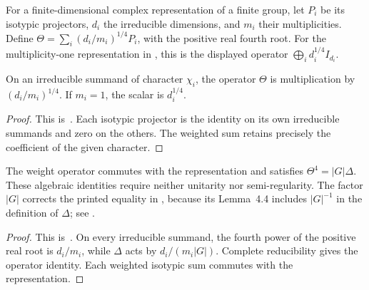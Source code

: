 \begin{definition}%
    \label{def:peps_representation_theta}
    \leanok
    For a finite-dimensional complex representation of a finite group,
    let $P_i$ be its isotypic projectors, $d_i$ the irreducible dimensions,
    and $m_i$ their multiplicities. Define
    $\Theta=\sum_i(d_i/m_i)^{1/4}P_i$, with the positive real fourth root.
    For the multiplicity-one representation in
    \cite[Section~7]{Schuch2010PEPS}, this is the displayed operator
    $\bigoplus_i d_i^{1/4}I_{d_i}$.
\end{definition}

\begin{lemma}%
    \label{thm:peps_representation_theta_scalar}
    \leanok
    On an irreducible summand of character $\chi_i$, the operator $\Theta$
    is multiplication by $(d_i/m_i)^{1/4}$. If $m_i=1$, the scalar is $d_i^{1/4}$.
\end{lemma}

\begin{proof}\leanok
    This is~\cite[``Action of the fourth-root weights'']{QICLean2026Blueprint}.
    Each isotypic projector is the identity on its own irreducible summands
    and zero on the others. The weighted sum retains precisely the coefficient
    of the given character.
\end{proof}

\begin{lemma}%
    \label{thm:peps_representation_theta_power}
    \leanok
    The weight operator commutes with the representation and satisfies
    $\Theta^4=|G|\Delta$. These algebraic identities require neither unitarity
    nor semi-regularity. The factor $|G|$ corrects the printed equality
    in \cite[Section~7]{Schuch2010PEPS}, because its Lemma~4.4 includes
    $|G|^{-1}$ in the definition of $\Delta$; see
    \cite{gap:rmp_peps_quantum_double_g_isometry}.
\end{lemma}

\begin{proof}\leanok
    This is~\cite[``Fourth power and symmetry of the weight
        operator'']{QICLean2026Blueprint}.
    On every irreducible summand, the fourth power of the positive real root
    is $d_i/m_i$, while $\Delta$ acts by $d_i/(m_i|G|)$.
    Complete reducibility gives the operator identity. Each weighted isotypic
    sum commutes with the representation.
\end{proof}
